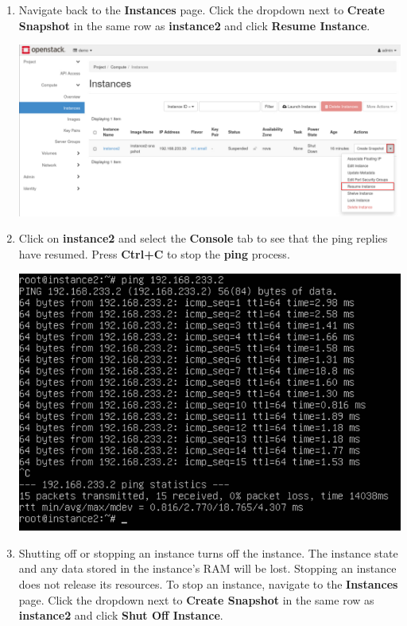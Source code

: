 \documentclass[letterpaper, 12pt]{article}
\begin{document}
\begin{enumerate}
    \item Navigate back to the \textbf{Instances} page.
    Click the dropdown next to \textbf{Create Snapshot} in the same row as \textbf{instance2} and click \textbf{Resume Instance}.

    \begin{center}
        \includegraphics[width=\linewidth]{images/part3/step10.png}
    \end{center}

    \item Click on \textbf{instance2} and select the \textbf{Console} tab to see that the ping replies have resumed.
    Press \textbf{Ctrl+C} to stop the \textbf{ping} process.

    \begin{center}
        \includegraphics[width=\linewidth]{images/part3/step11.png}
    \end{center}

    \item Shutting off or stopping an instance turns off the instance.
    The instance state and any data stored in the instance's RAM will be lost.
    Stopping an instance does not release its resources.
    To stop an instance, navigate to the \textbf{Instances} page.
    Click the dropdown next to \textbf{Create Snapshot} in the same row as \textbf{instance2} and click \textbf{Shut Off Instance}.


\end{enumerate}
\end{document}
